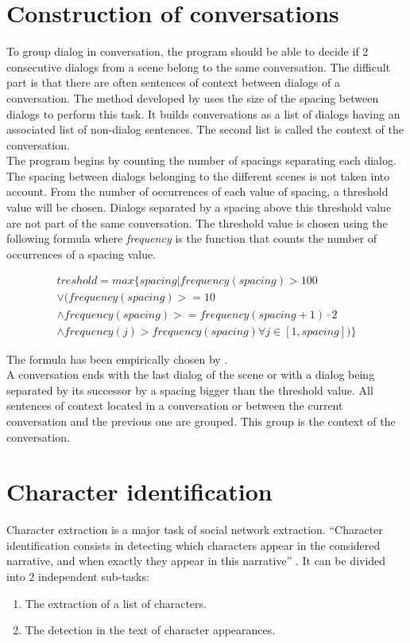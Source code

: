 \documentclass[a4paper, 12pt]{report}
\begin{document}
\section{Construction of conversations}
To group dialog in conversation, the program should be able to decide if 2 consecutive dialogs from a scene belong to the same conversation. The difficult part is that there are often sentences of context between dialogs of a conversation. The method developed by \cite{original_thesis} uses the size of the spacing between dialogs to perform this task. It builds conversations as a list of dialogs having an associated list of non-dialog sentences. The second list is called the context of the conversation.\\
The program begins by counting the number of spacings separating each dialog. The spacing between dialogs belonging to the different scenes is not taken into account. From the number of occurrences of each value of spacing, a threshold value will be chosen. Dialogs separated by a spacing above this threshold value are not part of the same conversation. The threshold value is chosen using the following formula where \textit{frequency} is the function that counts the number of occurrences of a spacing value.

\begin{equation}
\begin{split}
treshold = max\{spacing | frequency(spacing) > 100 \\
\vee (frequency(spacing) >= 10 \\
\wedge frequency(spacing) >= frequency(spacing + 1) \cdot 2 \\
\wedge frequency(j) > frequency(spacing) \forall j \in [1,spacing])\}
\end{split}
\end{equation}

The formula has been empirically chosen by \cite{original_thesis}.\\

A conversation ends with the last dialog of the scene or with a dialog being separated by its successor by a spacing bigger than the threshold value. All sentences of context located in a conversation or between the current conversation and the previous one are grouped. This group is the context of the conversation.\\

\section{Character identification}
Character extraction is a major task of social network extraction. ``Character identification consists in detecting which characters appear in the considered narrative, and when exactly they appear in this narrative'' \citep{fiction}. It can be divided into 2 independent sub-tasks:
\begin{enumerate}
\item The extraction of a list of characters.
\item The detection in the text of character appearances.
\end{enumerate}
\end{document}
